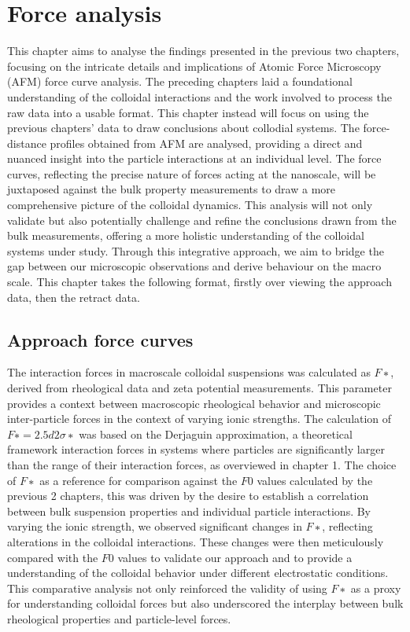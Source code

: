 \chapter{Force analysis}

This chapter aims to analyse the findings presented in the previous two chapters, focusing on the intricate details and implications of Atomic Force Microscopy (AFM) force curve analysis. The preceding chapters laid a foundational understanding of the colloidal interactions and the work involved to process the raw data into a usable format. This chapter instead will focus on using the previous chapters' data to draw conclusions about collodial systems. The force-distance profiles obtained from AFM are analysed, providing a direct and nuanced insight into the particle interactions at an individual level. The force curves, reflecting the precise nature of forces acting at the nanoscale, will be juxtaposed against the bulk property measurements to draw a more comprehensive picture of the colloidal dynamics. This analysis will not only validate but also potentially challenge and refine the conclusions drawn from the bulk measurements, offering a more holistic understanding of the colloidal systems under study. Through this integrative approach, we aim to bridge the gap between our microscopic observations and derive behaviour on the macro scale. This chapter takes the following format, firstly over viewing the approach data, then the retract data.

\section{Approach force curves}



The interaction forces in macroscale colloidal suspensions was calculated as $F∗$, derived from rheological data and zeta potential measurements. This parameter provides a context between macroscopic rheological behavior and microscopic inter-particle forces in the context of varying ionic strengths. The calculation of $F∗=2.5d2σ∗$ was based on the Derjaguin approximation, a theoretical framework interaction forces in systems where particles are significantly larger than the range of their interaction forces, as overviewed in chapter 1. The choice of $F∗$ as a reference for comparison against the $F0$ values calculated by the previous 2 chapters, this was driven by the desire to establish a correlation between bulk suspension properties and individual particle interactions. By varying the ionic strength, we observed significant changes in $F∗$, reflecting alterations in the colloidal interactions. These changes were then meticulously compared with the $F0$ values to validate our approach and to provide a understanding of the colloidal behavior under different electrostatic conditions. This comparative analysis not only reinforced the validity of using $F∗$ as a proxy for understanding colloidal forces but also underscored the interplay between bulk rheological properties and particle-level forces.

